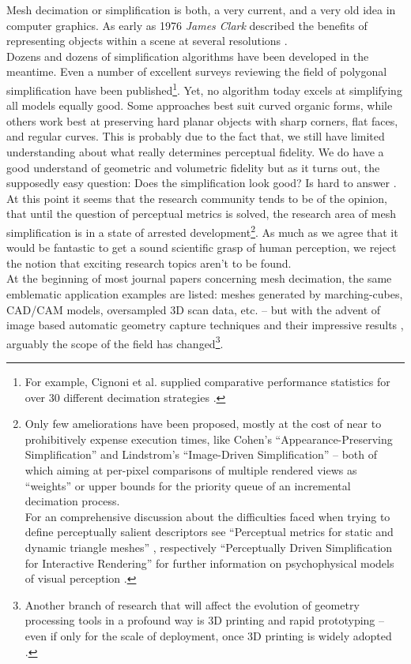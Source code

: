 Mesh decimation or simplification is both, a very current, and a very old idea in computer graphics.
As early as 1976 \textit{James Clark} described the benefits of representing objects within a scene at several resolutions \citep[cf.][]{Clark1976}.\\
Dozens and dozens of simplification algorithms have been developed in the meantime.
Even a number of excellent surveys reviewing the field of polygonal simplification have been published\footnote{ For example, Cignoni et al. supplied comparative performance statistics for over 30 different decimation strategies \citep[cf.][]{Cignoni1998, Heckbert1997}.}.
Yet, no algorithm today excels at simplifying all models equally good.
Some approaches best suit curved organic forms, while others work best at preserving hard planar objects with sharp corners, flat faces, and regular curves.
This is probably due to the fact that, we still have limited understanding about what really determines perceptual fidelity.
We do have a good understand of geometric and volumetric fidelity but as it turns out, the supposedly easy question:  Does the simplification look good?
Is hard to answer \citep[][cf. p.25]{Luebke2001}.\\
At this point it seems that the research community tends to be of the opinion, that until the question of perceptual metrics is solved, the research area of mesh simplification is in a state of arrested development\footnote{ Only few ameliorations have been proposed, mostly at the cost of near to prohibitively expense execution times, like Cohen’s ``Appearance-Preserving Simplification'' \citep[cf.][]{Cohen1998} and Lindstrom’s ``Image-Driven Simplification'' \citep[cf.][]{Lindstrom2000} -- both of which aiming at per-pixel comparisons of multiple rendered views as ``weights'' or upper bounds for the priority queue of an incremental decimation process.\\For an comprehensive discussion about the difficulties faced when trying to define perceptually salient descriptors see ``Perceptual metrics for static and dynamic triangle meshes'' \citep[cf.][]{Corsini2012}, respectively ``Perceptually Driven Simplification for Interactive Rendering'' for further information on psychophysical models of visual perception \citep[][]{Luebke2001a}.}. 
As much as we agree that it would be fantastic to get a sound scientific grasp of human perception, we reject the notion that exciting research topics aren't to be found.\\
At the beginning of most journal papers concerning mesh decimation, the same emblematic application examples are listed: meshes generated by marching-cubes, CAD/CAM models, oversampled 3D scan data, etc. -- but with the advent of image based automatic geometry capture techniques and their impressive results \citep[cf.][]{Pollefeys2004,Snavely2008}, arguably the scope of the field has changed\footnote{ Another branch of research that will affect the evolution of geometry processing tools in a profound way is 3D printing and rapid prototyping -- even if only for the scale of deployment, once 3D printing is widely adopted \citep[cf.][]{Vilbrandt2008,Bickel2010}.}.
